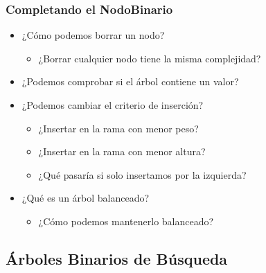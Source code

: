 \documentclass[11pt]{beamer}
\begin{document}
	\begin{frame}\frametitle{Completando el NodoBinario}
	\begin{itemize}
	\item ¿Cómo podemos borrar un nodo?
	    \begin{itemize}
	    \item ¿Borrar cualquier nodo tiene la misma complejidad?
	    \end{itemize}
	\item ¿Podemos comprobar si el árbol contiene un valor?
	\item ¿Podemos cambiar el criterio de inserción?
	    \begin{itemize}
	    \item ¿Insertar en la rama con menor peso?
	    \item ¿Insertar en la rama con menor altura?
	    \item ¿Qué pasaría si solo insertamos por la izquierda?
	    \end{itemize}
	\item ¿Qué es un árbol balanceado?
	    \begin{itemize}
	    \item ¿Cómo podemos mantenerlo balanceado?
	    \end{itemize}
	\end{itemize}
	\end{frame}

	\subsection{Árboles Binarios de Búsqueda}
\end{document}
